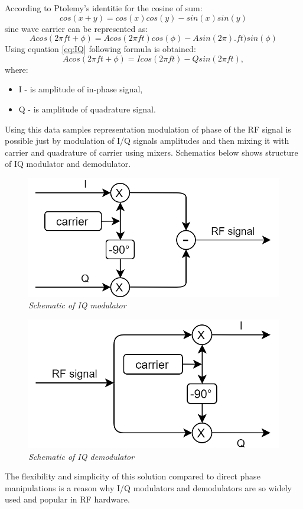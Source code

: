 \documentclass[en,printmode]{mgr}
\begin{document}
		According to Ptolemy’s identitie for the cosine of sum:
		\[
			cos\left(x+y\right) = 
			cos\left(x\right)  cos\left(y\right) - sin\left(x\right) sin\left(y\right)
		\] 
		sine wave carrier can be represented as:
		\[
			Acos\left(2\pi ft + \phi\right) = 
			Acos\left(2\pi ft\right)cos\left(\phi\right) - Asin\left(2\pi\right). ft)sin(\phi)
		\]
		Using equation \ref{eq:IQ} following formula is obtained:
		\[
			Acos\left(2\pi ft + \phi\right) = 
			I cos\left(2\pi f t\right) - Q sin\left(2\pi f t\right),
		\]
		where:
		\begin{itemize}
			\item I - is amplitude of in-phase signal,
			\item Q - is amplitude of quadrature signal.
		\end{itemize}
		
		Using this data samples representation modulation of phase of the RF signal is possible just by modulation of
		I/Q signals amplitudes and then mixing it with carrier and quadrature of carrier using mixers. Schematics below 
		shows structure of IQ modulator and demodulator.
		
		\begin{figure}[!htb]
    		\centering
   			\includegraphics[width=\textwidth]{images/iqmod.png}
    		\caption{\textit{Schematic of IQ modulator}}
    		\label{fig:polarplot}
		\end{figure}
		\vspace{1cm}
		\begin{figure}[!htb]
    		\centering
   			\includegraphics[width=\textwidth]{images/iqdemod.png}
    		\caption{\textit{Schematic of IQ demodulator}}
    		\label{fig:polarplot}
		\end{figure}
		\newpage
		The flexibility and simplicity of this solution compared to direct phase manipulations
		is a reason why I/Q modulators and demodulators are so widely used and popular in RF hardware.
		
\end{document}
